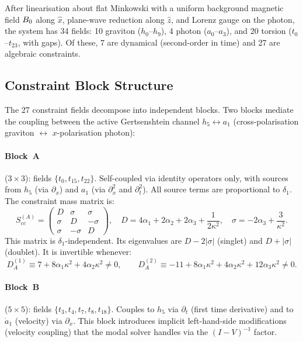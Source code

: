 After linearisation about flat Minkowski with a uniform background magnetic field $B_0$ along $\hat{x}$, plane-wave reduction along $\hat{z}$, and Lorenz gauge on the photon, the system has 34 fields: 10 graviton ($h_0$--$h_9$), 4 photon ($a_0$--$a_3$), and 20 torsion ($t_0$--$t_{23}$, with gaps). Of these, 7 are dynamical (second-order in time) and 27 are algebraic constraints.

\subsection{Constraint Block Structure}
\label{subsec:constraint-blocks}

The 27 constraint fields decompose into independent blocks. Two blocks mediate the coupling between the active Gertsenshtein channel $h_5 \leftrightarrow a_1$ (cross-polarisation graviton $\leftrightarrow$ $x$-polarisation photon):

\paragraph{Block~A} ($3\times3$): fields $\{t_0, t_{15}, t_{22}\}$. Self-coupled via identity operators only, with sources from $h_5$ (via $\partial_x$) and $a_1$ (via $\partial_x^2$ and $\partial_t^2$). All source terms are proportional to $\delta_1$. The constraint mass matrix is:
\begin{equation}
  S_{cc}^{(A)} = \begin{pmatrix}
    D & \sigma & \sigma \\
    \sigma & D & -\sigma \\
    \sigma & -\sigma & D
  \end{pmatrix},
  \quad
  D = 4\alpha_1 + 2\alpha_2 + 2\alpha_3 + \frac{1}{2\kappa^2},
  \quad
  \sigma = -2\alpha_3 + \frac{3}{\kappa^2}.
  \label{eq:block-a-mass}
\end{equation}
This matrix is $\delta_1$-independent. Its eigenvalues are $D - 2|\sigma|$ (singlet) and $D + |\sigma|$ (doublet). It is invertible whenever:
\begin{equation}
  D_A^{(1)} \equiv 7 + 8\alpha_1\kappa^2 + 4\alpha_2\kappa^2 \neq 0,
  \qquad
  D_A^{(2)} \equiv -11 + 8\alpha_1\kappa^2 + 4\alpha_2\kappa^2 + 12\alpha_3\kappa^2 \neq 0.
  \label{eq:block-a-denominators}
\end{equation}

\paragraph{Block~B} ($5\times5$): fields $\{t_3, t_4, t_7, t_8, t_{18}\}$. Couples to $h_5$ via $\partial_t$ (first time derivative) and to $\dot{a}_1$ (velocity) via $\partial_x$. This block introduces implicit left-hand-side modifications (velocity coupling) that the modal solver handles via the $(I - V)^{-1}$ factor.

